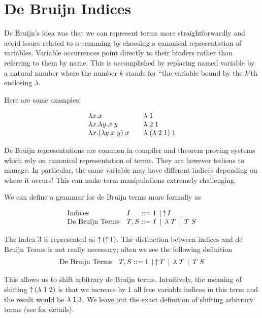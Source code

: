 \section{De Bruijn Indices}\label{sec:debruijn}

De Bruijn's idea was that we can represent terms more
straightforwardly and avoid issues related to $\alpha$-renaming by
choosing a canonical representation of variables. Variable occurrences
point directly to their binders rather than referring to them by
name. This is accomplished by replacing named variable by a natural
number where the number $k$ stands for ``the variable bound by the
$k$'th enclosing $\lambda$.

Here are some examples:

\[
\begin{array}{l@{\qquad}l}
\lam x. x  & \lamdb 1 \\
\lam x. \lam y . x\;y & \lamdb 2\; 1\\
\lam x. (\lam y. x \; y)\; x & \lamdb (\lamdb 2\;1) \;1
\end{array}
\]

De Bruijn representations are common in compiler and theorem proving
systems which rely on canonical representation of terms. They are
however tedious to manage. In particular, the same variable may have
different indices depending on where it occurs! This can make term
manipulations extremely challenging.

We can define a grammar for de Bruijn terms more formally as

\[
\begin{array}{ll@{\bnfas}l}
\mbox{Indices}         & I    & 1 \bnfalt \shift I \\
\mbox{De Bruijn Terms} & T, S & I \bnfalt \lamdb T \bnfalt T \app S
\end{array}
\]

The index $3$ is represented as $\uparrow^{}\!(\uparrow^{}\!1)$. The distinction
between indices and de Bruijn Terms is not really necessary; often we
see the following definition
\[
\begin{array}{ll@{\bnfas}l}
\mbox{De Bruijn Terms} & T, S & 1 \bnfalt \shift T \bnfalt \lamdb T \bnfalt T \app S
\end{array}
\]

This allows us to shift arbitrary de Bruijn terms. Intuitively, the
meaning of shifting $\uparrow^{}\!(\lambda\; 1 \; 2)$ is that we increase by 1 all free
variable indices in this term and the result would be $\lambda\; 1 \; 3$. We leave
out the exact definition of shifting arbitrary terms (see \cite{TAPL}
for details).


